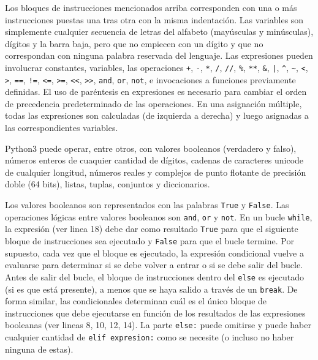 \documentclass[a4paper, 11pt]{article}
\theoremstyle{plain}
\theoremstyle{definition}
\begin{document}
Los bloques de instrucciones mencionados arriba corresponden con una o más
instrucciones puestas una tras otra con la misma indentación. Las variables
son simplemente cualquier secuencia de letras del alfabeto (mayúsculas
y minúsculas), dígitos y la barra baja, pero que no empiecen con un dígito y
que no correspondan con ninguna palabra reservada del lenguaje. Las expresiones
pueden involucrar constantes, variables, las operaciones \texttt{+}, \texttt{-},
\texttt{*}, \texttt{/}, \texttt{//}, \texttt{\%}, \texttt{**}, \texttt{\&},
\texttt{|}, \texttt{\^}, \texttt{\~}, \texttt{<}, \texttt{>}, \texttt{==},
\texttt{!=}, \texttt{<=}, \texttt{>=}, \texttt{<<}, \texttt{>>}, \texttt{and},
\texttt{or}, \texttt{not}, e invocaciones a funciones previamente definidas. El
uso de paréntesis en expresiones es necesario para cambiar el orden de
precedencia predeterminado de las operaciones. En una asignación múltiple,
todas las expresiones son calculadas (de izquierda a derecha) y luego asignadas
a las correspondientes variables.

\bigskip

Python3 puede operar, entre otros, con valores booleanos (verdadero y falso),
números enteros de cuaquier cantidad de dígitos, cadenas de caracteres unicode
de cualquier longitud, números reales y complejos de punto flotante de precisión
doble (64 bits), listas, tuplas, conjuntos y diccionarios.

\bigskip

Los valores booleanos son representados con las palabras \texttt{True} y
\texttt{False}. Las operaciones lógicas entre valores booleanos son \texttt{and},
\texttt{or} y \texttt{not}. En un bucle \texttt{while}, la expresión (ver linea 18)
debe dar como resultado \texttt{True} para que el siguiente bloque de instrucciones
sea ejecutado y \texttt{False} para que el bucle termine. Por supuesto, cada
vez que el bloque es ejecutado, la expresión condicional vuelve a evaluarse
para determinar si se debe volver a entrar o si se debe salir del bucle. Antes de
salir del bucle, el bloque de instrucciones dentro del \texttt{else} es ejecutado
(si es que está presente), a menos que se haya salido a través de un \texttt{break}.
De forma similar, las condicionales determinan cuál es el único bloque de
instrucciones que debe ejecutarse en función de los resultados de las expresiones
booleanas (ver lineas 8, 10, 12, 14). La parte \texttt{else:} puede omitirse y puede
haber cualquier cantidad de \texttt{elif expresion:} como se necesite (o incluso no
haber ninguna de estas).
\end{document}
